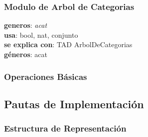 \documentclass[10pt, a4paper]{article}
\begin{document}
\subsubsection{\Large Modulo de Arbol de Categorias\\}
	\textbf{generos}: \textit{acat}\\
	\textbf{usa}: bool, nat, conjunto\\
		\textbf{se explica con}: TAD ArbolDeCategorias\\
		\textbf{g\'eneros}: acat\\

\subsubsection{\Large Operaciones B\'asicas}

    \subsection{\huge Pautas de Implementaci\'{o}n}	

        \subsubsection{\Large Estructura de Representaci\'{o}n} 
\end{document}
